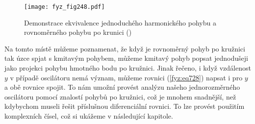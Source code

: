     \begin{figure}[ht!] %
      \centering
      \texttt{[image: fyz\_fig248.pdf]}
      \caption{Demonstrace ekvivalence jednoduchého harmonického pohybu a rovnoměrného pohybu po 
              krunici
              (\cite[s.~290]{Feynman01})}
      \label{fyz:fig248}
    \end{figure}

    Na tomto místě můžeme poznamenat, že když je rovnoměrný pohyb po kružnici tak úzce spjat s
    kmitavým pohybem, můžeme kmitavý pohyb popsat jednodušeji jako projekci pohybu hmotného bodu po
    kružnici. Jinak řečeno, i když vzdálenost \(y\) v případě oscilátoru nemá význam, můžeme rovnici
    (\ref{fyz:eq728}) napsat i pro \(y\) a obě rovnice spojit. To nám umožní provést analýzu našeho
    jednorozměrného oscilátoru pomocí znalostí pohybů po kružnici, což je mnohem snadnější, než
    kdybychom museli řešit příslušnou diferenciální rovnici. To lze provést použitím komplexních
    čísel, což si ukážeme v následující kapitole.

